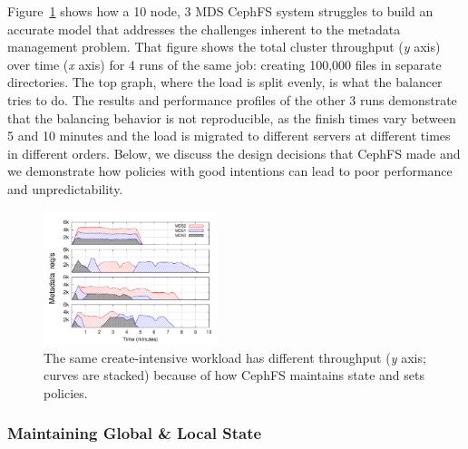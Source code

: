 Figure~\ref{figure:creates-thruput} shows how a 10 node, 3 MDS CephFS system struggles to build an accurate model that addresses the challenges inherent to the metadata management problem. That figure shows the total cluster throughput ({\it y} axis) over time ({\it x} axis) for 4 runs of the same job: creating 100,000 files in separate directories. The top graph, where the load is split evenly, is what the balancer tries to do. The results and performance profiles of the other 3 runs demonstrate that the balancing behavior is not reproducible, as the finish times vary between 5 and 10 minutes and the load is migrated to different servers at different times in different orders. Below, we discuss the design decisions that CephFS made and we demonstrate how policies with good intentions can lead to poor performance and unpredictability.

\begin{figure}[tb]
	\includegraphics[width=0.45\textwidth]{./chapters/mantle/creates-thruput-runs2.pdf}
	\caption{The same create-intensive workload has different throughput ({\it y} axis; curves are stacked) because of how CephFS maintains state and sets policies.\label{figure:creates-thruput}}
\end{figure}
\subsubsection{Maintaining Global \& Local State}
\label{the-challenge-in-maintaining_global_local_state}

